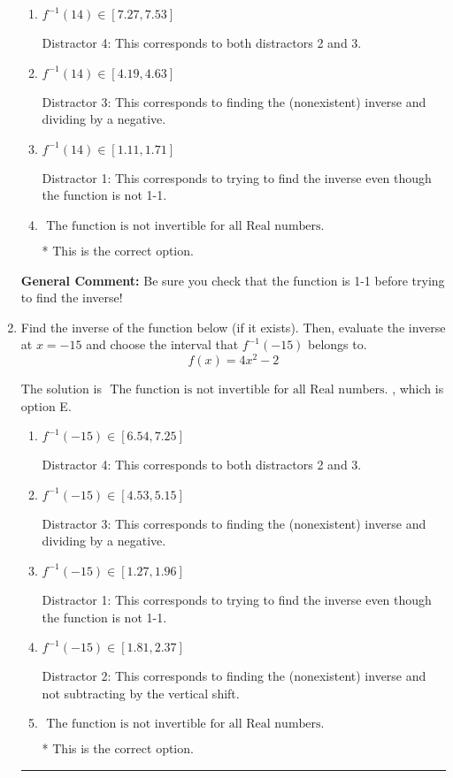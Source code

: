 \documentclass{extbook}[14pt]
\newcommand{\litem}[1]{\item #1

\rule{\textwidth}{0.4pt}}
\begin{document}
\begin{enumerate}
{\begin{enumerate}[label=\Alph*.]
 Distractor 2: This corresponds to finding the (nonexistent) inverse and not subtracting by the vertical shift.
\item \( f^{-1}(14) \in [7.27, 7.53] \)

 Distractor 4: This corresponds to both distractors 2 and 3.
\item \( f^{-1}(14) \in [4.19, 4.63] \)

 Distractor 3: This corresponds to finding the (nonexistent) inverse and dividing by a negative.
\item \( f^{-1}(14) \in [1.11, 1.71] \)

 Distractor 1: This corresponds to trying to find the inverse even though the function is not 1-1. 
\item \( \text{ The function is not invertible for all Real numbers. } \)

* This is the correct option.
\end{enumerate}

\textbf{General Comment:} Be sure you check that the function is 1-1 before trying to find the inverse!
}
\litem{
Find the inverse of the function below (if it exists). Then, evaluate the inverse at $x = -15$ and choose the interval that $f^{-1}(-15)$ belongs to.
\[ f(x) = 4 x^2 - 2 \]

The solution is \( \text{ The function is not invertible for all Real numbers. } \), which is option E.\begin{enumerate}[label=\Alph*.]
\item \( f^{-1}(-15) \in [6.54, 7.25] \)

 Distractor 4: This corresponds to both distractors 2 and 3.
\item \( f^{-1}(-15) \in [4.53, 5.15] \)

 Distractor 3: This corresponds to finding the (nonexistent) inverse and dividing by a negative.
\item \( f^{-1}(-15) \in [1.27, 1.96] \)

 Distractor 1: This corresponds to trying to find the inverse even though the function is not 1-1. 
\item \( f^{-1}(-15) \in [1.81, 2.37] \)

 Distractor 2: This corresponds to finding the (nonexistent) inverse and not subtracting by the vertical shift.
\item \( \text{ The function is not invertible for all Real numbers. } \)

* This is the correct option.
\end{enumerate}

}
\end{enumerate}
\end{document}

